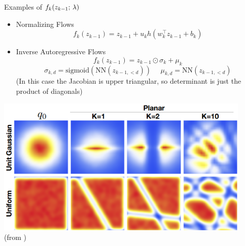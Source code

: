 \begin{frame}
Examples of $f_k(z_{k-1} ; \, \lambda )$
\begin{itemize}
    \item Normalizing Flows \citep{Rezende2015} 
    \[f_k(z_{k-1}) =  z_{k-1} + u_k h(w_k^\top z_{k-1} + b_k)\]
    \item Inverse Autoregressive Flows \citep{Kingma2016}
    \[ f_k(z_{k-1}) = z_{k-1} \odot \sigma_{k} + \mu_{k} \]
    \[ \sigma_{k, d} = \text{sigmoid}(\text{NN}(z_{k-1, <d})) \,\,\,\,\,\,\,\, \mu_{k, d} = \text{NN}(z_{k-1, <d})\]
    (In this case the Jacobian is upper triangular, so determinant is just the product of diagonals)
\end{itemize}
\end{frame} 

\begin{frame}
\center 
\includegraphics[scale=0.4]{pics/normflows.png} \\
\vspace{5mm}
(from \cite{Rezende2015})
\end{frame} 
